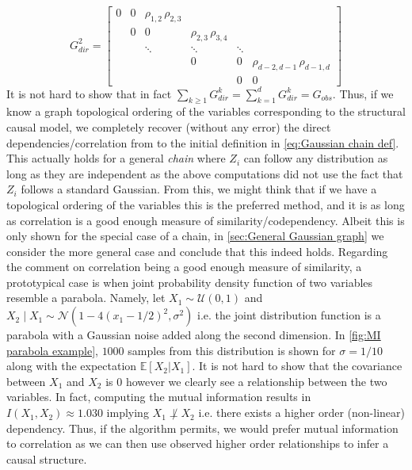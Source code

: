 \documentclass[../Thesis.tex]{subfiles}
\begin{document}
$$G_{dir}^2 = \begin{bmatrix}
        0 & 0 & \rho_{1,2}   \, \rho_{2,3} &                          &        &                               \\
          & 0 & 0                          & \rho_{2,3} \, \rho_{3,4} &        &                               \\
          &   & \ddots                     & \ddots                   & \ddots &                               \\
          &   &                            & 0                        & 0      & \rho_{d-2,d-1}\, \rho_{d-1,d} \\
          &   &                            &                          & 0      & 0
    \end{bmatrix}$$
It is not hard to show that in fact $\sum_{k\geq 1} G_{dir}^k = \sum_{k=1}^d G_{dir}^k = G_{obs}$. Thus, if we know a graph topological ordering of the variables corresponding to the structural causal model, we completely recover (without any error) the direct dependencies/correlation from to the initial definition in \autoref{eq:Gaussian chain def}. This actually holds for a general \textit{chain} where $Z_i$ can follow any distribution as long as they are independent as the above computations did not use the fact that $Z_i$ follows a standard Gaussian. From this, we might think that if we have a topological ordering of the variables this is the preferred method, and it is as long as correlation is a good enough measure of similarity/codependency. Albeit this is only shown for the special case of a chain, in \autoref{sec:General Gaussian graph} we consider the more general case and conclude that this indeed holds. Regarding the comment on correlation being a good enough measure of similarity, a prototypical case is when joint probability density function of two variables resemble a parabola. Namely, let $X_1\sim \mathcal{U}\left(0,1\right)$ and $X_2 \mid X_1 \sim \mathcal{N}\left(1 - 4\left(x_1 - 1/2\right)^2 , \sigma^2\right)$ i.e. the joint distribution function is a parabola with a Gaussian noise added along the second dimension. In \autoref{fig:MI parabola example}, $1000$ samples from this distribution is shown for $\sigma = 1/10$ along with the expectation $\mathbb{E}\left[X_2 | X_1\right]$. It is not hard to show that the covariance between $X_1$ and $X_2$ is $0$ however we clearly see a relationship between the two variables. In fact, computing the mutual information results in $I\left(X_1,X_2\right) \approx 1.030$ implying $X_1 \not\perp X_2$ i.e. there exists a higher order (non-linear) dependency. Thus, if the algorithm permits, we would prefer mutual information to correlation as we can then use observed higher order relationships to infer a causal structure.
\end{document}
